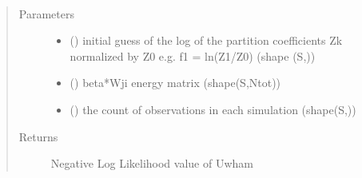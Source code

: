 \documentclass[letterpaper,10pt,english]{sphinxmanual}
\begin{document}
\begin{fulllineitems}
\label{\detokenize{wham:wham.Uwham.Uwham_NLL_eq}}~\begin{quote}\begin{description}
\item[{Parameters}] \leavevmode\begin{itemize}
\item {} 
 () \textendash{} initial guess of the log of the partition coefficients Zk normalized by Z0 e.g. f1 = \sphinxhyphen{}ln(Z1/Z0) (shape (S,))

\item {} 
 () \textendash{} beta*Wji energy matrix (shape(S,Ntot))

\item {} 
 () \textendash{} the count of observations in each simulation (shape(S,))

\end{itemize}

\item[{Returns}] \leavevmode
Negative Log Likelihood value of Uwham

\end{description}\end{quote}

\end{fulllineitems}



\renewcommand{\indexname}{Python Module Index}
\begin{sphinxtheindex}
\let\bigletter\sphinxstyleindexlettergroup
\bigletter{w}
\item\relax{}
\item\relax{}
\item\relax{}
\item\relax{}
\end{sphinxtheindex}

\renewcommand{\indexname}{Index}
\printindex
\end{document}
